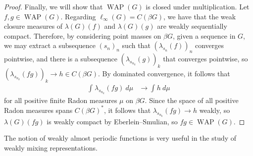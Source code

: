 \documentclass[10pt]{mypackage}
\begin{document}
\begin{proof}
  Finally, we will show that $\operatorname{WAP}\left( G \right)$ is closed under multiplication. Let $f,g\in \operatorname{WAP}\left( G \right)$. Regarding $\ell_{\infty}\left( G \right) = C\left( \beta G \right)$, we have that the weak closure measures of $ \lambda(G)(f) $ and $\lambda(G)(g)$ are weakly sequentially compact. Therefore, by considering point masses on $\beta G$, given a sequence in $G$, we may extract a subsequence $\left( s_n \right)_n$ such that $\left( \lambda_{s_n}\left( f \right) \right)_{n}$ converges pointwise, and there is a subsequence $\left( \lambda_{s_{n_k}}\left( g \right) \right)_{k}$ that converges pointwise, so $\left( \lambda_{s_{n_k}}\left( fg \right) \right)_{k}\rightarrow h\in C\left( \beta G \right)$. By dominated convergence, it follows that
  \begin{align*}
    \int_{}^{} \lambda_{s_{n_k}}\left( fg \right)\:d\mu &\rightarrow \int_{}^{} h\:d\mu
  \end{align*}
  for all positive finite Radon measures $\mu$ on $\beta G$. Since the space of all positive Radon measures spans $C\left( \beta G \right)^{\ast}$, it follows that $\lambda_{s_{n_k}}\left( fg \right)\rightarrow h$ weakly, so $ \lambda(G)\left( fg \right) $ is weakly compact by Eberlein--Smulian, so $fg\in \operatorname{WAP}\left( G \right)$.
\end{proof}
The notion of weakly almost periodic functions is very useful in the study of weakly mixing representations.
\end{document}
